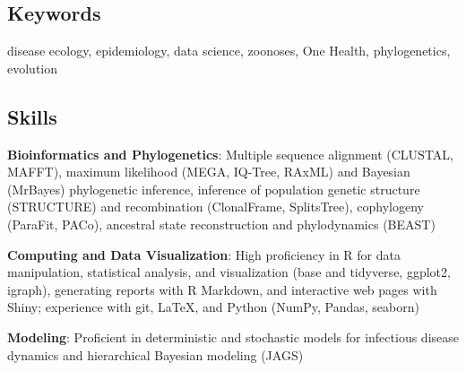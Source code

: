 \documentclass{cv}
\begin{document}
\subsection*{Keywords}

disease ecology, epidemiology, data science, zoonoses, One Health, phylogenetics, evolution

\subsection*{Skills}

\textbf{Bioinformatics and Phylogenetics}: Multiple sequence alignment (CLUSTAL, MAFFT), maximum likelihood (MEGA, IQ-Tree, RAxML) and Bayesian (MrBayes) phylogenetic inference, inference of population genetic structure (STRUCTURE) and recombination (ClonalFrame, SplitsTree), cophylogeny (ParaFit, PACo), ancestral state reconstruction and phylodynamics (BEAST)

\textbf{Computing and Data Visualization}: High proficiency in R for data manipulation, statistical analysis, and visualization (base and tidyverse, ggplot2, igraph), generating reports with R Markdown, and interactive web pages with Shiny; experience with git, \LaTeX, and Python (NumPy, Pandas, seaborn)

\textbf{Modeling}: Proficient in deterministic and stochastic models for infectious disease dynamics and hierarchical Bayesian modeling (JAGS)
\end{document}
